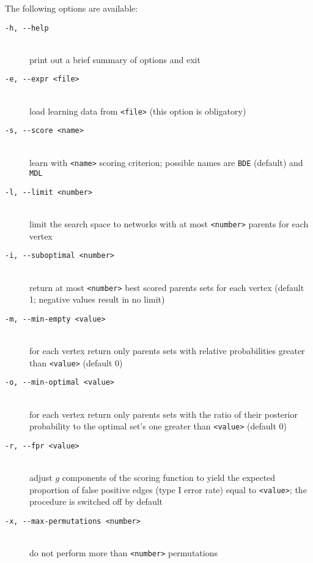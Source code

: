 The following options are available:
\begin{description}
\item[\texttt{-h, -\hspace{0pt}-help}]~\\
 print out a brief summary of options and exit
\item[\texttt{-e, -\hspace{0pt}-expr <file>}]~\\
 load learning data from \texttt{<file>} (this option is obligatory)
\item[\texttt{-s, -\hspace{0pt}-score <name>}]~\\
 learn with \texttt{<name>} scoring criterion;
 possible names are \texttt{BDE} (default) and \texttt{MDL}
\item[\texttt{-l, -\hspace{0pt}-limit <number>}]~\\
 limit the search space to networks with at most 
 \texttt{<number>} parents for each vertex
\item[\texttt{-i, -\hspace{0pt}-suboptimal <number>}]~\\
 return at most \texttt{<number>} best scored parents sets for each vertex 
 (default 1; negative values result in no limit)
\item[\texttt{-m, -\hspace{0pt}-min-empty <value>}]~\\
 for each vertex return only parents sets with relative probabilities 
 greater than \texttt{<value>} (default 0)
\item[\texttt{-o, -\hspace{0pt}-min-optimal <value>}]~\\
 for each vertex return only parents sets with the ratio of their
 posterior probability to the optimal set's one
 greater than \texttt{<value>} (default 0)
\item[\texttt{-r, -\hspace{0pt}-fpr <value>}]~\\
 adjust $g$ components of the scoring function to yield
 the expected proportion of false positive edges (type I error rate)
 equal to \texttt{<value>};
 the procedure is switched off by default
\item[\texttt{-x, -\hspace{0pt}-max-permutations <number>}]~\\
 do not perform more than \texttt{<number>} permutations 

\end{description}
